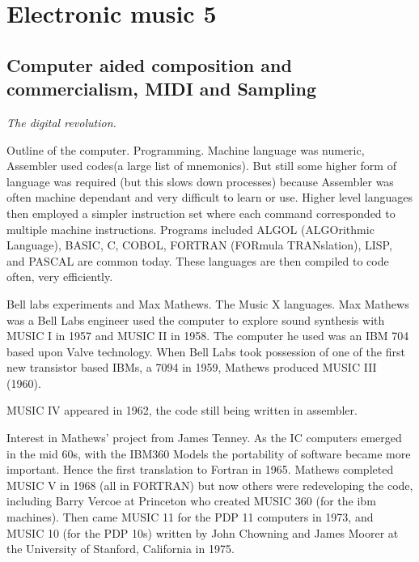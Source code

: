 
\chapter{Electronic music 5}
\label{history5}

\section{Computer aided composition and commercialism, MIDI and Sampling}

\textit{The digital revolution.}

Outline of the computer. Programming. Machine language was numeric, Assembler used codes(a large list of mnemonics). But still some higher form of language was required (but this slows down processes) because Assembler was often machine dependant and very difficult to learn or use.  Higher level languages then employed a simpler instruction set where each command corresponded to multiple machine instructions.  Programs included ALGOL (ALGOrithmic Language), BASIC, C, COBOL, FORTRAN (FORmula TRANslation), LISP, and PASCAL are common today.  These languages are then compiled to code often, very efficiently.  

Bell labs experiments and Max Mathews. The Music X languages.  Max Mathews was a Bell Labs engineer used the computer to explore sound synthesis with MUSIC I in 1957 and MUSIC II in 1958.  The computer he used was an IBM 704 based upon Valve technology.   When Bell Labs took possession of one of the first new transistor based IBMs, a 7094 in 1959, Mathews produced MUSIC III (1960).

MUSIC IV appeared in 1962, the code still being written in assembler.

Interest in Mathews' project from James Tenney.  As the IC computers emerged in the mid 60s, with the IBM360 Models the portability of software became more important.  Hence the first translation to Fortran in 1965.  Mathews completed MUSIC V in 1968 (all in FORTRAN) but now others were redeveloping the code, including Barry Vercoe at Princeton who created MUSIC 360 (for the ibm machines). Then came MUSIC 11 for the PDP 11 computers in 1973, and MUSIC 10 (for the PDP 10s) written by John Chowning and James Moorer at the University of Stanford, California in 1975.

